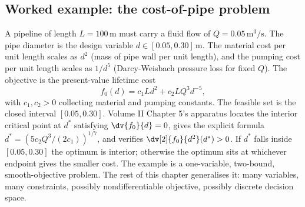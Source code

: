 \subsection{Worked example: the cost-of-pipe problem}

A pipeline of length $L = 100\,\si{\meter}$ must carry a fluid
flow of $Q = 0.05\,\si{\cubic\meter\per\second}$. The pipe
diameter is the design variable $d \in [0.05, 0.30]\,\si{\meter}$.
The material cost per unit length scales as $d^{2}$ (mass of pipe
wall per unit length), and the pumping cost per unit length scales
as $1/d^{5}$ (Darcy-Weisbach pressure loss for fixed $Q$). The
objective is the present-value lifetime cost
\[
f_{0}(d) = c_{1} L d^{2} + c_{2} L Q^{3} d^{-5},
\]
with $c_{1}, c_{2} > 0$ collecting material and pumping
constants. The feasible set is the closed interval $[0.05, 0.30]$.
Volume II Chapter 5's apparatus locates the interior critical
point at $d^{*}$ satisfying $\dv{f_{0}}{d} = 0$, gives the
explicit formula $d^{*} = (5 c_{2} Q^{3} / (2 c_{1}))^{1/7}$, and
verifies $\dv[2]{f_{0}}{d^{2}}(d^{*}) > 0$. If $d^{*}$ falls
inside $[0.05, 0.30]$ the optimum is interior; otherwise the
optimum sits at whichever endpoint gives the smaller cost. The
example is a one-variable, two-bound, smooth-objective problem.
The rest of this chapter generalises it: many variables, many
constraints, possibly nondifferentiable objective, possibly
discrete decision space.

